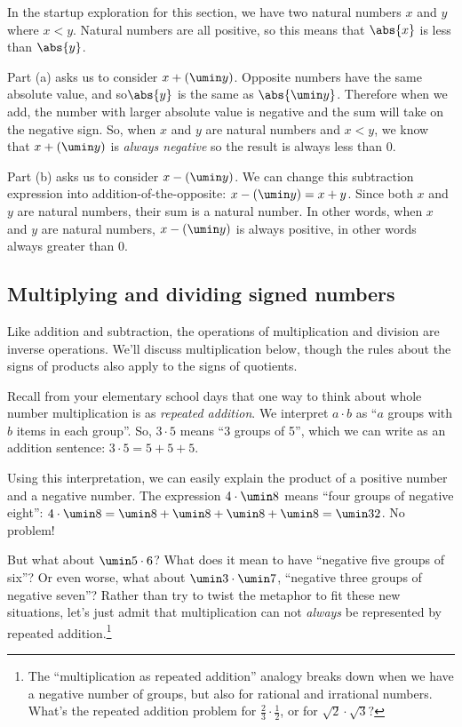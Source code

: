 In the startup exploration for this section, we have two natural numbers $x$ and $y$ where $x < y$. Natural numbers are all positive, so this means that $\abs{x}$ is less than $\abs{y}$.

Part (a) asks us to consider $x+(\umin y)$. Opposite numbers have the same absolute value,  and so$\abs{y}$ is the same as $\abs{\umin y}$. Therefore when we add, the number with larger absolute value is negative and the sum will take on the negative sign. So, when $x$ and $y$ are natural numbers and $x < y$, we know that $x+(\umin y)$ is \textit{always negative} so the result is always less than 0.

Part (b) asks us to consider $x-(\umin y)$. We can change this subtraction expression into addition-of-the-opposite: $x-(\umin y) = x+y$. Since both $x$ and $y$ are natural numbers, their sum is a natural number. In other words, when $x$ and $y$ are natural numbers, $x-(\umin y)$ is always positive, in other words always greater than 0.

\subsection{Multiplying and dividing signed numbers}

Like addition and subtraction, the operations of multiplication and division are inverse operations. We'll discuss multiplication below, though the rules about the signs of products also apply to the signs of quotients.

Recall from your elementary school days that one way to think about whole number multiplication is as \textit{repeated addition}. We interpret $a \cdot b$ as ``$a$ groups with $b$ items in each group''. So, $3 \cdot 5$ means ``3 groups of 5'', which we can write as an addition sentence: $3 \cdot 5 = 5 + 5 + 5$.

Using this interpretation, we can easily explain the product of a positive number and a negative number. The expression $4\cdot\umin8$ means ``four groups of negative eight'': $4 \cdot \umin8 = \umin8 + \umin8 + \umin8 + \umin8 = \umin32$. No problem!

But what about $\umin5 \cdot 6$? What does it mean to have ``negative five groups of six''? Or even worse, what about $\umin3 \cdot \umin7$, ``negative three groups of negative seven''? Rather than try to twist the metaphor to fit these new situations, let's just admit that multiplication can not \textit{always} be represented by repeated addition.\footnote{The ``multiplication as repeated addition'' analogy breaks down when we have a negative number of groups, but also for rational and irrational numbers. What's the repeated addition problem for $\frac{2}{3} \cdot \frac{1}{2}$, or for $\sqrt{2} \cdot \sqrt{3}?$}

